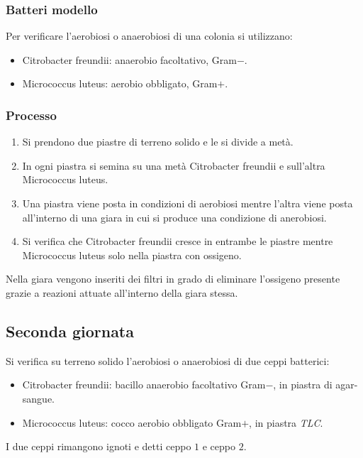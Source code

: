 		\subsubsection{Batteri modello}
		Per verificare l'aerobiosi o anaerobiosi di una colonia si utilizzano:
		\begin{multicols}{2}
			\begin{itemize}
				\item Citrobacter freundii: anaerobio facoltativo, Gram$-$.
				\item Micrococcus luteus: aerobio obbligato, Gram$+$.
			\end{itemize}
		\end{multicols}

		\subsubsection{Processo}
		\begin{enumerate}
			\item Si prendono due piastre di terreno solido e le si divide a met\`a.
			\item In ogni piastra si semina su una met\`a Citrobacter freundii e sull'altra Micrococcus luteus.
			\item Una piastra viene posta in condizioni di aerobiosi mentre l'altra viene posta all'interno di una giara in cui si produce una condizione di anerobiosi.
			\item Si verifica che Citrobacter freundii cresce in entrambe le piastre mentre Micrococcus luteus solo nella piastra con ossigeno.
		\end{enumerate}
		Nella giara vengono inseriti dei filtri in grado di eliminare l'ossigeno presente grazie a reazioni attuate all'interno della giara stessa.

	\subsection{Seconda giornata}
	Si verifica su terreno solido l'aerobiosi o anaerobiosi di due ceppi batterici:
	\begin{multicols}{2}
		\begin{itemize}
			\item Citrobacter freundii: bacillo anaerobio facoltativo Gram$-$, in piastra di agar-sangue.
			\item Micrococcus luteus: cocco aerobio obbligato Gram$+$, in piastra \emph{TLC}.
		\end{itemize}
	\end{multicols}
	I due ceppi rimangono ignoti e detti ceppo $1$ e ceppo $2$.

